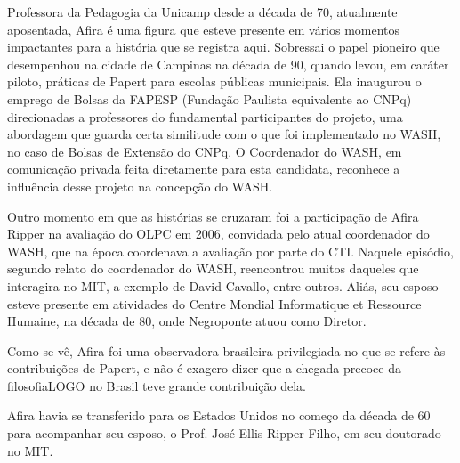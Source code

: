 \documentclass[
12pt,		%
openright,	%
twoside,  %
a4paper,			%
chapter=TITLE,		%
english,			%
french,				%
spanish,			%
brazil				%
]{USPSC-classe/USPSC}
\begin{document}
Professora da Pedagogia da Unicamp desde a d\'ecada de 70, atualmente aposentada, Afira \'e uma figura que esteve presente em v\'arios momentos impactantes para a hist\'oria que se registra aqui. Sobressai o papel pioneiro que  desempenhou na cidade de Campinas na d\'ecada de 90, quando levou, em car\'ater piloto, pr\'aticas de Papert para escolas p\'ublicas municipais. Ela inaugurou o emprego de Bolsas da FAPESP (Funda\c{c}\~ao Paulista equivalente ao CNPq) direcionadas a professores do fundamental participantes do projeto, uma abordagem que guarda certa similitude com o que foi implementado no WASH, no caso de Bolsas de Extens\~ao do CNPq. O Coordenador do WASH, em comunica\c{c}\~ao privada feita diretamente para esta candidata, reconhece a influ\^encia desse projeto na concep\c{c}\~ao do WASH.









Outro momento em que as hist\'orias se cruzaram foi a participa\c{c}\~ao de Afira Ripper na avalia\c{c}\~ao do OLPC em 2006, convidada pelo atual coordenador do WASH, que na \'epoca coordenava a avalia\c{c}\~ao por parte do CTI. Naquele epis\'odio, segundo relato do coordenador do WASH, reencontrou muitos daqueles que interagira no MIT, a exemplo de David Cavallo, entre outros. Ali\'as, seu esposo esteve presente em atividades do Centre Mondial Informatique et Ressource Humaine, na d\'ecada de 80, onde Negroponte atuou como Diretor.









Como se v\^e, Afira foi uma observadora brasileira privilegiada no que se refere \`as contribui\c{c}\~oes de Papert, e n\~ao \'e exagero dizer que a chegada precoce da \textquotedbl filosofia\textquotedbl  LOGO no Brasil teve grande contribui\c{c}\~ao dela.









Afira havia se transferido para os Estados Unidos no come\c{c}o da d\'ecada de 60 para acompanhar seu esposo, o Prof. Jos\'e Ellis Ripper Filho, em seu doutorado no MIT.
\end{document}
